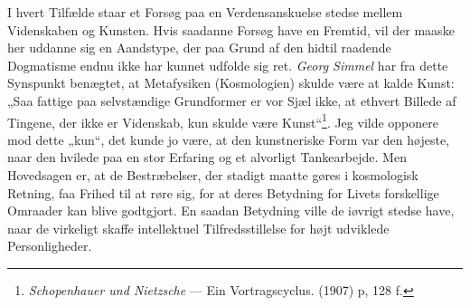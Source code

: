 \documentclass[12pt,a4paper]{book}
\begin{document}
I hvert Tilfælde staar et Forsøg paa en Verdensanskuelse stedse mellem Videnskaben og
Kunsten. Hvis saadanne Forsøg have en Fremtid, vil der maaske her uddanne sig en
Aandstype, der paa Grund af den hidtil raadende Dogmatisme endnu ikke har kunnet udfolde
sig ret. \emph{Georg Simmel} har fra dette Synspunkt benægtet, at Metafysiken
(Kosmologien) skulde være at kalde Kunst: „Saa fattige paa selvstændige Grundformer er
vor Sjæl ikke, at ethvert Billede af Tingene, der ikke er Videnskab, kun skulde være
Kunst“\footnote{\emph{Schopenhauer und Nietzsche} --- Ein Vortragscyclus. (1907) p, 128 f.}. Jeg vilde opponere mod dette „kun“, det kunde jo være, at den kunstneriske Form var
den højeste, naar den hvilede paa en stor Erfaring og et alvorligt Tankearbejde. Men
Hovedsagen er, at de Bestræbelser, der stadigt maatte gøres i kosmologisk Retning, faa
Frihed til at røre sig, for at deres Betydning for Livets forskellige Omraader kan blive
godtgjort. En saadan Betydning ville de iøvrigt stedse have, naar de virkeligt skaffe intellektuel Tilfredsstillelse for højt udviklede Personligheder.
\end{document}
